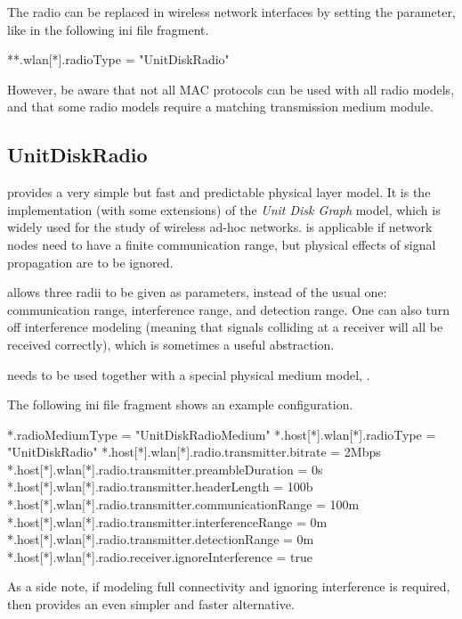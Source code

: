 The radio can be replaced in wireless network interfaces by setting the
 parameter, like in the following ini file fragment.

\begin{inifile}
**.wlan[*].radioType = "UnitDiskRadio"
\end{inifile}

However, be aware that not all MAC protocols can be used with all radio models,
and that some radio models require a matching transmission medium module.

\subsection{UnitDiskRadio}
\label{sec:phy:unitdiskradio}

 provides a very simple but fast and predictable
physical layer model. It is the implementation (with some extensions)
of the \textit{Unit Disk Graph} model, which is widely used
for the study of wireless ad-hoc networks.
 is applicable if network nodes need
to have a finite communication range, but physical effects
of signal propagation are to be ignored.

 allows three radii to be given as parameters,
instead of the usual one: communication range, interference range, and
detection range. One can also turn off interference modeling
(meaning that signals colliding at a receiver will all be received
correctly), which is sometimes a useful abstraction.

 needs to be used together with a special physical
medium model, .

The following ini file fragment shows an example configuration.

\begin{inifile}
*.radioMediumType = "UnitDiskRadioMedium"
*.host[*].wlan[*].radioType = "UnitDiskRadio"
*.host[*].wlan[*].radio.transmitter.bitrate = 2Mbps
*.host[*].wlan[*].radio.transmitter.preambleDuration = 0s
*.host[*].wlan[*].radio.transmitter.headerLength = 100b
*.host[*].wlan[*].radio.transmitter.communicationRange = 100m
*.host[*].wlan[*].radio.transmitter.interferenceRange = 0m
*.host[*].wlan[*].radio.transmitter.detectionRange = 0m
*.host[*].wlan[*].radio.receiver.ignoreInterference = true
\end{inifile}

As a side note, if modeling full connectivity and ignoring
interference is required, then 
provides an even simpler and faster alternative.

